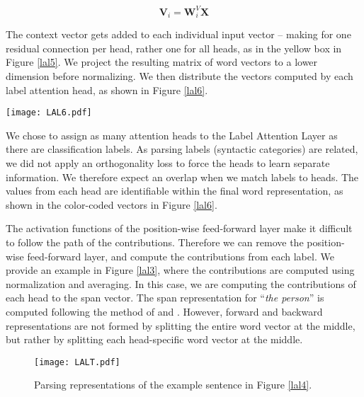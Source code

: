 \documentclass[11pt,a4paper]{article}
\begin{document}
\begin{equation}
    \mathbf{V}_i = \mathbf{W}^V_{i} \mathbf{X}
\end{equation}

The context vector gets added to each individual input vector – making for one residual connection per head, rather one for all heads, as in the yellow box in Figure \ref{lal5}. We project the resulting matrix of word vectors to a lower dimension before normalizing. We then distribute the vectors computed by each label attention head, as shown in Figure \ref{lal6}.

\begin{figure*}
    \centering
    \texttt{[image: LAL6.pdf]}
    \caption{Redistribution of the head-specific word representations to form word vectors by concatenation. We use different colors for each label attention head. The colors show where the head outputs go in the word representations. We do not use colors for the vectors resulting from the position-wise feed-forward layer, as the head-specific information moved.}
    \label{lal6}
\end{figure*}

We chose to assign as many attention heads to the Label Attention Layer as there are classification labels. As parsing labels (syntactic categories) are related, we did not apply an orthogonality loss to force the heads to learn separate information. We therefore expect an overlap when we match labels to heads. The values from each head are identifiable within the final word representation, as shown in the color-coded vectors in Figure \ref{lal6}.

The activation functions of the position-wise feed-forward layer make it difficult to follow the path of the contributions. Therefore we can remove the position-wise feed-forward layer, and compute the contributions from each label. We provide an example in Figure \ref{lal3}, where the contributions are computed using normalization and averaging. In this case, we are computing the contributions of each head to the span vector. The span representation for ``\textit{the person}'' is computed following the method of \citet{gaddy2018s} and \citet{kitaev2018constituency}. However, forward and backward representations are not formed by splitting the entire word vector at the middle, but rather by splitting each head-specific word vector at the middle.

\begin{figure}
    \centering
    \texttt{[image: LALT.pdf]}
    \caption{Parsing representations of the example sentence in Figure \ref{lal4}.}
    \label{lal_trees}
\end{figure}
\end{document}
